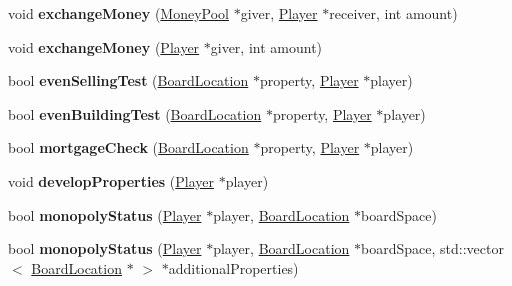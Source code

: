 \begin{DoxyCompactItemize}
\item 
\hypertarget{classGame_a002285fd8dbb724e3495c93cf1d735da}{void {\bfseries exchange\-Money} (\hyperlink{classMoneyPool}{Money\-Pool} $\ast$giver, \hyperlink{classPlayer}{Player} $\ast$receiver, int amount)}\label{classGame_a002285fd8dbb724e3495c93cf1d735da}

\item 
\hypertarget{classGame_a62b5a52d15b937115a292c38f851ca72}{void {\bfseries exchange\-Money} (\hyperlink{classPlayer}{Player} $\ast$giver, int amount)}\label{classGame_a62b5a52d15b937115a292c38f851ca72}

\item 
\hypertarget{classGame_ace5f9a05e80bd0502636b9c8c14b56ec}{bool {\bfseries even\-Selling\-Test} (\hyperlink{classBoardLocation}{Board\-Location} $\ast$property, \hyperlink{classPlayer}{Player} $\ast$player)}\label{classGame_ace5f9a05e80bd0502636b9c8c14b56ec}

\item 
\hypertarget{classGame_a358b7df2f08a7446aded76de0b475b92}{bool {\bfseries even\-Building\-Test} (\hyperlink{classBoardLocation}{Board\-Location} $\ast$property, \hyperlink{classPlayer}{Player} $\ast$player)}\label{classGame_a358b7df2f08a7446aded76de0b475b92}

\item 
\hypertarget{classGame_ab6fbcaf0b36f38f6f9bc5be73b2e69b4}{bool {\bfseries mortgage\-Check} (\hyperlink{classBoardLocation}{Board\-Location} $\ast$property, \hyperlink{classPlayer}{Player} $\ast$player)}\label{classGame_ab6fbcaf0b36f38f6f9bc5be73b2e69b4}

\item 
\hypertarget{classGame_af31e635c918f29a803aa023fc3ba5b30}{void {\bfseries develop\-Properties} (\hyperlink{classPlayer}{Player} $\ast$player)}\label{classGame_af31e635c918f29a803aa023fc3ba5b30}

\item 
\hypertarget{classGame_a1c1018d5a80cd5df009fd0b1fdd71778}{bool {\bfseries monopoly\-Status} (\hyperlink{classPlayer}{Player} $\ast$player, \hyperlink{classBoardLocation}{Board\-Location} $\ast$board\-Space)}\label{classGame_a1c1018d5a80cd5df009fd0b1fdd71778}

\item 
\hypertarget{classGame_a1fe4405a985e685b213b4d46cd0de14c}{bool {\bfseries monopoly\-Status} (\hyperlink{classPlayer}{Player} $\ast$player, \hyperlink{classBoardLocation}{Board\-Location} $\ast$board\-Space, std\-::vector$<$ \hyperlink{classBoardLocation}{Board\-Location} $\ast$ $>$ $\ast$additional\-Properties)}\label{classGame_a1fe4405a985e685b213b4d46cd0de14c}


\end{DoxyCompactItemize}
